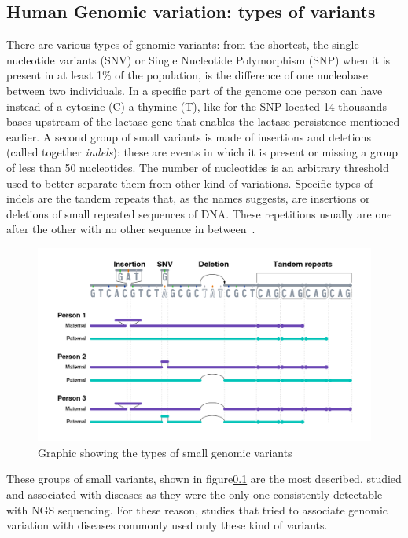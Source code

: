 \subsection{Human Genomic variation: types of variants}
There are various types of genomic variants: from the shortest, the single-nucleotide variants (SNV) or Single Nucleotide Polymorphism (SNP) when it is present in at least 1\% of the population, is the difference of one nucleobase between two individuals. In a specific part of the genome one person can have instead of a cytosine (C) a thymine (T), like for the SNP located 14 thousands bases upstream of the lactase gene that enables the lactase persistence mentioned earlier\cite{lactase_persistance}.
A second group of small variants is made of insertions and deletions (called together \emph{indels}): these are events in which it is present or missing a group of less than 50 nucleotides. The number of nucleotides is an arbitrary threshold used to better separate them from other kind of variations. Specific types of indels are the tandem repeats that, as the names suggests, are insertions or deletions of small repeated sequences of DNA. These repetitions usually are one after the other with no other sequence in between~\cite{nih_variation}.\\
\begin{figure}[h!]
	\centering
	\includegraphics[width=\linewidth]{figures/background/small_variants.png}
	\caption[Small genomic variants.]{Graphic showing the types of small genomic variants~\cite{nih_variation}}
	\label{fig:small_variants}
\end{figure}
These groups of small variants, shown in figure\ref{} are the most described, studied and associated with diseases as they were the only one consistently detectable with NGS sequencing. For these reason, studies that tried to associate genomic variation with diseases commonly used only these kind of variants.\\
